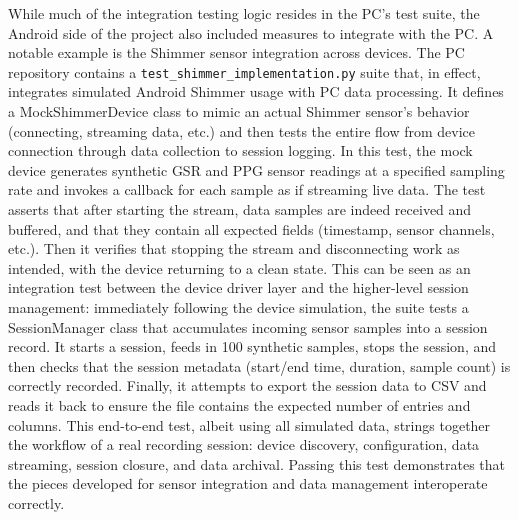 While much of the integration testing logic resides in the PC's test suite, the Android side of the project also included measures to integrate with the PC. A notable example is the Shimmer sensor integration across devices. The PC repository contains a \texttt{test\_shimmer\_implementation.py} suite that, in effect, integrates simulated Android Shimmer usage with PC data processing. It defines a MockShimmerDevice class to mimic an actual Shimmer sensor's behavior (connecting, streaming data, etc.) and then tests the entire flow from device connection through data collection to session logging. In this test, the mock device generates synthetic GSR and PPG sensor readings at a specified sampling rate and invokes a callback for each sample as if streaming live data. The test asserts that after starting the stream, data samples are indeed received and buffered, and that they contain all expected fields (timestamp, sensor channels, etc.). Then it verifies that stopping the stream and disconnecting work as intended, with the device returning to a clean state. This can be seen as an integration test between the device driver layer and the higher-level session management: immediately following the device simulation, the suite tests a SessionManager class that accumulates incoming sensor samples into a session record. It starts a session, feeds in 100 synthetic samples, stops the session, and then checks that the session metadata (start/end time, duration, sample count) is correctly recorded. Finally, it attempts to export the session data to CSV and reads it back to ensure the file contains the expected number of entries and columns. This end-to-end test, albeit using all simulated data, strings together the workflow of a real recording session: device discovery, configuration, data streaming, session closure, and data archival. Passing this test demonstrates that the pieces developed for sensor integration and data management interoperate correctly.

